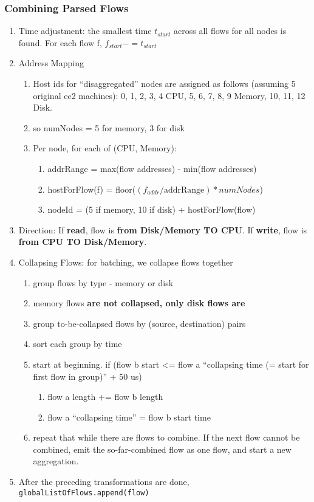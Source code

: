 \subsubsection{Combining Parsed Flows}
\begin{enumerate}
\item Time adjustment: the smallest time $t_{start}$ across all flows for all nodes is found. For each flow f, $f_{start} -= t_{start}$
\item Address Mapping
    \begin{enumerate}
    \item Host ids for ``disaggregated'' nodes are assigned as follows (assuming 5 original ec2 machines): 0, 1, 2, 3, 4 CPU, 5, 6, 7, 8, 9 Memory, 10, 11, 12 Disk.
    \item so numNodes = 5 for memory, 3 for disk
    \item Per node, for each of (CPU, Memory):
        \begin{enumerate}
        \item addrRange = max(flow addresses) - min(flow addresses)
        \item hostForFlow(f) = floor($(f_{addr} / \text{addrRange}) * numNodes$)
        \item nodeId = (5 if memory, 10 if disk) + hostForFlow(flow)
        \end{enumerate}
    \end{enumerate}
\item Direction: If \textbf{read}, flow is \textbf{from Disk/Memory TO CPU}. If \textbf{write}, flow is \textbf{from CPU TO Disk/Memory}.
\item Collapsing Flows: for batching, we collapse flows together
    \begin{enumerate}
    \item group flows by type - memory or disk
    \item memory flows \textbf{are not collapsed, only disk flows are}
    \item group to-be-collapsed flows by (source, destination) pairs
    \item sort each group by time
    \item start at beginning. if (flow b start <= flow a ``collapsing time (= start for first flow in group)'' + 50 us)
        \begin{enumerate}
        \item flow a length += flow b length
        \item flow a ``collapsing time'' = flow b start time
        \end{enumerate}
    \item repeat that while there are flows to combine. If the next flow cannot be combined, emit the so-far-combined flow as one flow, and start a new aggregation.
    \end{enumerate}
\item After the preceding transformations are done, \texttt{globalListOfFlows.append(flow)}
\end{enumerate}

